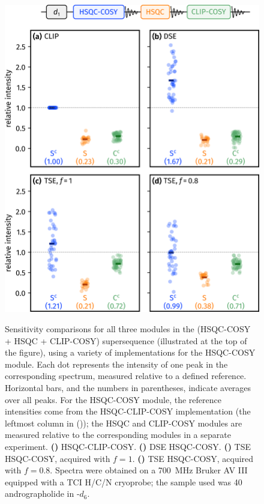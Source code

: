\documentclass[a4paper,12pt]{article}
\newcommand{\andro}{Spectra were obtained on a \SI{700}{\MHz} Bruker AV III equipped with a TCI H/C/N cryoprobe; the sample used was \SI{40}{\milli\molar} andrographolide in \ch{DMSO}-$d_6$.}
\begin{document}
\begin{refsection}
\begin{figure}[!ht]
    \centering
    \includegraphics[]{hsqccosy_sens.png}%
    {\label{fig:hsqccosy_sens_clip}}%
    {\label{fig:hsqccosy_sens_dse}}%
    {\label{fig:hsqccosy_sens_tse_1}}%
    {\label{fig:hsqccosy_sens_tse_0p8}}%
    \caption[Sensitivity comparisons for  supersequences]{
        Sensitivity comparisons for all three modules in the  (HSQC-COSY + HSQC + CLIP-COSY) supersequence (illustrated at the top of the figure), using a variety of implementations for the HSQC-COSY module.
        Each dot represents the intensity of one peak in the corresponding spectrum, measured relative to a defined reference.
        Horizontal bars, and the numbers in parentheses, indicate averages over all peaks.
        For the HSQC-COSY module, the reference intensities come from the HSQC-CLIP-COSY implementation (the leftmost column in ()); the HSQC and CLIP-COSY modules are measured relative to the corresponding modules in a separate  experiment.
        \textbf{()} HSQC-CLIP-COSY.
        \textbf{()} DSE HSQC-COSY.
        \textbf{()} TSE HSQC-COSY, acquired with $f = 1$.
        \textbf{()} TSE HSQC-COSY, acquired with $f = 0.8$.
        \andro{}
    }
    \label{fig:hsqccosy_sens}
\end{figure}


\end{refsection}
\end{document}
